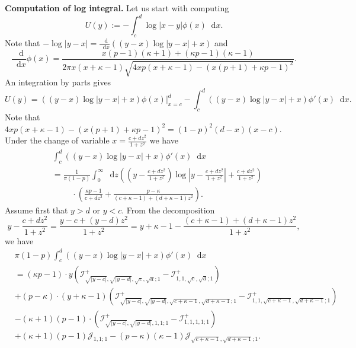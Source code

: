 \documentclass[reqno,11pt]{amsart}
\numberwithin{equation}{section}
\theoremstyle{definition}
\newcommand*\diff{\mathop{}\!\mathrm{d}}
\begin{document}
\noindent\textbf{Computation of log integral.}
Let us start with computing 
\begin{equation*}
    U(y):= -\int_c^d\log|x-y|\phi(x)\diff x.
\end{equation*}
 Note that $-\log |y-x|=\frac{\diff}{\diff x}((y-x)\log|y-x|+x)$ and 
\begin{equation*}
    \frac{\diff}{\diff x}\phi(x) = \frac{x(p-1)(\kappa+1)+(\kappa p-1)(\kappa-1)}{2\pi x(x+\kappa-1)\sqrt{4xp(x+\kappa-1)-(x(p+1)+\kappa p-1)^2}}.
\end{equation*}
An integration by parts gives 
\begin{equation*}
    U(y) = \left((y-x)\log|y-x|+x\right)\phi(x)\Big|_{x=c}^d-\int_c^d \left((y-x)\log|y-x|+x\right)\phi'(x)\diff x.
\end{equation*}
Note that $4xp(x+\kappa-1)-(x(p+1)+\kappa p-1)^2=(1-p)^2(d-x)(x-c)$. Under the change of variable $x=\frac{c+dz^2}{1+z^2}$ we have 
\begin{equation*}
\begin{aligned}
    &\int_c^d \left((y-x)\log|y-x|+x\right)\phi'(x)\diff x \\   
    &= \frac{1}{\pi(1-p)}\int_0^\infty \diff z\left(\left(y-\frac{c+dz^2}{1+z^2}\right)\log\left|y-\frac{c+dz^2}{1+z^2}\right|+\frac{c+dz^2}{1+z^2}\right)\\
    &\hspace{1cm}\cdot\left(\frac{\kappa p-1}{c+dz^2}+\frac{p-\kappa}{(c+\kappa-1)+(d+\kappa-1)z^2}\right).
\end{aligned}
\end{equation*}
Assume first that $y>d$ or $y<c$. From the decomposition
\begin{equation*}
    y-\frac{c+dz^2}{1+z^2}=\frac{y-c+(y-d)z^2}{1+z^2}=y+\kappa-1-\frac{(c+\kappa-1)+(d+\kappa-1)z^2}{1+z^2},
\end{equation*} 
we have 
\begin{equation*}
\begin{aligned}
    &\pi(1-p) \int_c^d \left((y-x)\log|y-x|+x\right)\phi'(x)\diff x \\   
    &=  (\kappa p-1)\cdot y\left(\mathcal{I}^+_{\sqrt{|y-c|},\sqrt{|y-d|},\sqrt{c},\sqrt{d};1}-\mathcal{I}^+_{1,1,\sqrt{c},\sqrt{d};1}\right)\\
    &+(p-\kappa)\cdot (y+\kappa-1)\left(\mathcal{I}^+_{\sqrt{|y-c|},\sqrt{|y-d|},\sqrt{c+\kappa-1},\sqrt{d+\kappa-1};1}-\mathcal{I}^+_{1,1,\sqrt{c+\kappa-1},\sqrt{d+\kappa-1};1}\right)\\
    &-(\kappa+1)(p-1)\cdot \left(\mathcal{I}^+_{\sqrt{|y-c|},\sqrt{|y-d|},1,1;1}-\mathcal{I}^+_{1,1,1,1;1}\right)\\
    &+(\kappa+1)(p-1)\mathcal{J}_{1,1;1}-(p-\kappa)(\kappa-1)\mathcal{J}_{\sqrt{c+\kappa-1},\sqrt{d+\kappa-1};1}.
\end{aligned}
\end{equation*}
\end{document}
